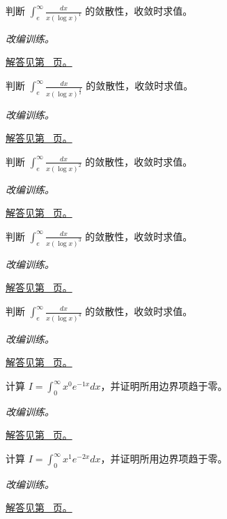 \documentclass[UTF8,12pt,a4paper,fontset=fandol]{ctexart}
\begin{document}
\begin{example}[对数修正的临界情形]\label{ex:c19q15}
判断 $\displaystyle\int_e^\infty\frac{dx}{x(\log x)^{1}}$ 的敛散性，收敛时求值。
\par\textit{改编训练。}\par\hyperref[ans:c19q15]{解答见第~\pageref{ans:c19q15} 页。}
\end{example}
\begin{example}[对数修正的临界情形]\label{ex:c19q16}
判断 $\displaystyle\int_e^\infty\frac{dx}{x(\log x)^{\frac{3}{2}}}$ 的敛散性，收敛时求值。
\par\textit{改编训练。}\par\hyperref[ans:c19q16]{解答见第~\pageref{ans:c19q16} 页。}
\end{example}
\begin{example}[对数修正的临界情形]\label{ex:c19q17}
判断 $\displaystyle\int_e^\infty\frac{dx}{x(\log x)^{2}}$ 的敛散性，收敛时求值。
\par\textit{改编训练。}\par\hyperref[ans:c19q17]{解答见第~\pageref{ans:c19q17} 页。}
\end{example}
\begin{example}[对数修正的临界情形]\label{ex:c19q18}
判断 $\displaystyle\int_e^\infty\frac{dx}{x(\log x)^{3}}$ 的敛散性，收敛时求值。
\par\textit{改编训练。}\par\hyperref[ans:c19q18]{解答见第~\pageref{ans:c19q18} 页。}
\end{example}
\begin{example}[对数修正的临界情形]\label{ex:c19q19}
判断 $\displaystyle\int_e^\infty\frac{dx}{x(\log x)^{4}}$ 的敛散性，收敛时求值。
\par\textit{改编训练。}\par\hyperref[ans:c19q19]{解答见第~\pageref{ans:c19q19} 页。}
\end{example}
\begin{example}[指数衰减积分的递推]\label{ex:c19q20}
计算 $I=\displaystyle\int_0^\infty x^{0}e^{-1x}dx$，并证明所用边界项趋于零。
\par\textit{改编训练。}\par\hyperref[ans:c19q20]{解答见第~\pageref{ans:c19q20} 页。}
\end{example}
\begin{example}[指数衰减积分的递推]\label{ex:c19q21}
计算 $I=\displaystyle\int_0^\infty x^{1}e^{-2x}dx$，并证明所用边界项趋于零。
\par\textit{改编训练。}\par\hyperref[ans:c19q21]{解答见第~\pageref{ans:c19q21} 页。}
\end{example}
\end{document}
